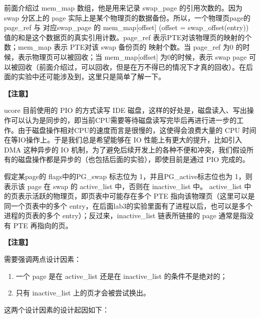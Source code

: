前面介绍过 mem\_map 数组，他是用来记录 swap\_page 的引用次数的。因为
swap 分区上的 page 实际上是某个物理页的数据备份。所以，一个物理页page的
page\_ref 与 对应swap\_page 的 mem\_map{[}offset{]} (offset =
swap\_offset(entry)) 值的和是这个数据页的真实引用计数。page\_ref
表示PTE对该物理页的映射的个数；mem\_map 表示 PTE对该 swap 备份页的
映射个数。当 page\_ref 为0 的时候，表示物理页可以被回收；当
mem\_map{[}offset{]} 为0的时候，表示 swap page
可以被回收（前面介绍过，可以回收，但是在万不得已的情况下才真的回收）。在后面的实验中还可能涉及到，这里只是简单了解一下。

\textbf{【注意】}

ucore 目前使用的 PIO 的方式读写 IDE
磁盘，这样的好处是，磁盘读入、写出操作可以认为是同步的，即当前CPU需要等待磁盘读写完毕后再进行进一步的工作。由于磁盘操作相对CPU的速度而言是很慢的，这使得会浪费大量的
CPU 时间在等IO操作上。于是我们总是希望能够在 IO
性能上有更大的提升，比如引入 DMA 这种异步的 IO
机制，为了避免后续开发上的各种不便和冲突，我们假设所有的磁盘操作都是异步的（也包括后面的实验），即使目前是通过
PIO 完成的。

假定某page的 flags中的PG\_swap 标志位为 1，并且PG\_active标志位也为
1，则表示该 page 在 swap 的 active\_list 中，否则在 inactive\_list 中。
active\_list 中的页表示活跃的物理页，即页表中可能存在多个 PTE
指向该物理页（这里可以是同一个页表中的多个
entry，在后面lab3的实验里面有了进程以后，也可以是多个进程的页表的多个
entry）；反过来，inactive\_list 链表所链接的 page 通常是指没有 PTE
再指向的页。

\textbf{【注意】}

需要强调两点设计因素：

\begin{enumerate}
\def\labelenumi{\arabic{enumi}.}
\item
  一个 page 是在 active\_list 还是在 inactive\_list 的条件不是绝对的；
\item
  只有 inactive\_list 上的页才会被尝试换出。
\end{enumerate}

这两个设计因素的设计起因如下：

